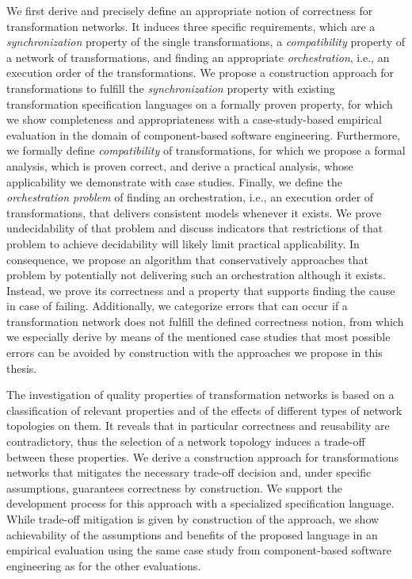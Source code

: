 We first derive and precisely define an appropriate notion of correctness for transformation networks.
It induces three specific requirements, which are a \emph{synchronization} property of the single transformations, a \emph{compatibility} property of a network of transformations, and finding an appropriate \emph{orchestration}, i.e., an execution order of the transformations.
We propose a construction approach for transformations to fulfill the \emph{synchronization} property with existing transformation specification languages on a formally proven property, for which we show completeness and appropriateness with a case-study-based empirical evaluation in the domain of component-based software engineering.
Furthermore, we formally define \emph{compatibility} of transformations, for which we propose a formal analysis, which is proven correct, and derive a practical analysis, whose applicability we demonstrate with case studies.
Finally, we define the \emph{orchestration problem} of finding an orchestration, i.e., an execution order of transformations, that delivers consistent models whenever it exists.
We prove undecidability of that problem and discuss indicators that restrictions of that problem to achieve decidability will likely limit practical applicability.
In consequence, we propose an algorithm that conservatively approaches that problem by potentially not delivering such an orchestration although it exists.
Instead, we prove its correctness and a property that supports finding the cause in case of failing.
Additionally, we categorize errors that can occur if a transformation network does not fulfill the defined correctness notion, from which we especially derive by means of the mentioned case studies that most possible errors can be avoided by construction with the approaches we propose in this thesis.

The investigation of quality properties of transformation networks is based on a classification of relevant properties and of the effects of different types of network topologies on them.
It reveals that in particular correctness and reusability are contradictory, thus the selection of a network topology induces a trade-off between these properties.
We derive a construction approach for transformations networks that mitigates the necessary trade-off decision and, under specific assumptions, guarantees correctness by construction.
We support the development process for this approach with a specialized specification language.
While trade-off mitigation is given by construction of the approach, we show achievability of the assumptions and benefits of the proposed language in an empirical evaluation using the same case study from component-based software engineering as for the other evaluations.

